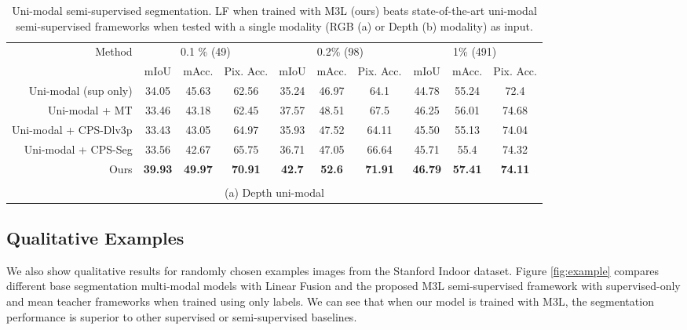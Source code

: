 \documentclass[10pt,twocolumn,letterpaper]{article}
\makeatletter
\newcommand\footnoteref[1]{\protected@xdef\@thefnmark{\ref{#1}}\@footnotemark}
\makeatother
\begin{document}
\begin{table*}[]
{\begin{tabular}{rccccccccc}
\toprule
\multirow{2}{*}{Method} & \multicolumn{3}{c}{0.1 \% (49)} & \multicolumn{3}{c}{0.2\% (98)} & \multicolumn{3}{c}{1\% (491)} \\
 & mIoU & mAcc. & \multicolumn{1}{c|}{Pix. Acc.} & mIoU & mAcc. & \multicolumn{1}{c|}{Pix. Acc.} & mIoU & mAcc. & Pix. Acc. \\ \midrule
Uni-modal (sup only) & 34.05 & 45.63 & \multicolumn{1}{c|}{62.56} & 35.24 & 46.97 & \multicolumn{1}{c|}{64.1} & 44.78 & 55.24 & 72.4 \\
Uni-modal + MT \cite{mt} & 33.46 & 43.18 & \multicolumn{1}{c|}{62.45} & 37.57 & 48.51 & \multicolumn{1}{c|}{67.5} & 46.25 & 56.01 & 74.68 \\
Uni-modal + CPS-Dlv3p \cite{chen2021-CPS} & 33.43 & 43.05 & \multicolumn{1}{c|}{64.97} & 35.93 & 47.52	&\multicolumn{1}{c|}{64.11} & 45.50 & 55.13 & 74.04 \\
Uni-modal + CPS-Seg\footnoteref{note:cps-seg} \cite{chen2021-CPS}& 33.56 & 42.67 & \multicolumn{1}{c|}{65.75} & 36.71 & 47.05 & \multicolumn{1}{c|}{66.64} & 45.71 & 55.4 & 74.32 \\ \midrule
Ours & \textbf{39.93} & \textbf{49.97} & \multicolumn{1}{c|}{\textbf{70.91}} & \textbf{42.7} & \textbf{52.6} & \multicolumn{1}{c|}{\textbf{71.91}} & \textbf{46.79} & \textbf{57.41} & \textbf{74.11} \\ \bottomrule


\multicolumn{10}{c}{\vspace{0.1cm}}\\
\multicolumn{10}{c}{(a) Depth uni-modal}\\

\end{tabular}
}
\caption{Uni-modal semi-supervised segmentation. LF when trained with M3L (ours) beats state-of-the-art uni-modal semi-supervised frameworks when tested with a single modality (RGB (a) or Depth (b) modality) as input.}
\label{tab:uni-modal}
\end{table*}  \subsection{Qualitative Examples}
We also show qualitative results for randomly chosen examples images from the Stanford Indoor \cite{stanfordindoor} dataset. 
Figure \ref{fig:example} compares different base segmentation multi-modal models with Linear Fusion and the proposed M3L semi-supervised framework with supervised-only and mean teacher \cite{mt} frameworks when trained using only  labels. 
We can see that when our model is trained with M3L, the segmentation performance is superior to other supervised or semi-supervised baselines.
\end{document}
